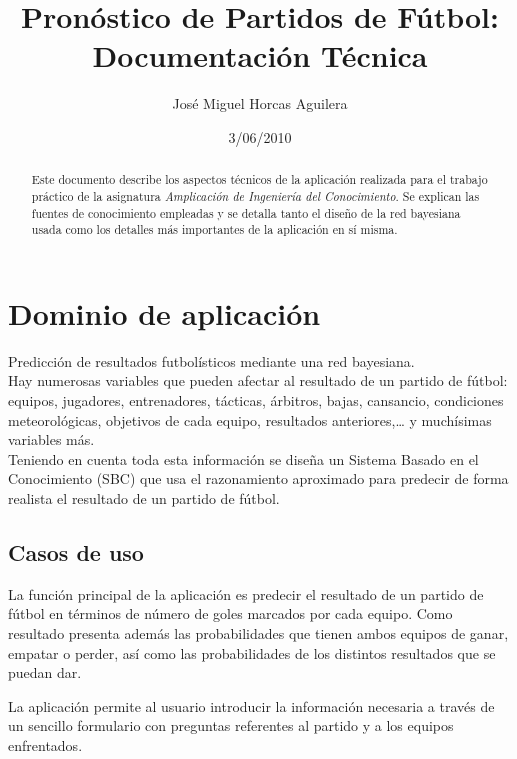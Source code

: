\documentclass[a4paper,12pt]{article}
\title{Pronóstico de Partidos de Fútbol:\\Documentación Técnica}
\author{José Miguel Horcas Aguilera}
\date{3/06/2010}
\begin{document}
\renewcommand{\figurename}{Figura}
\maketitle

\begin{abstract} %
Este documento describe los aspectos técnicos de la aplicación realizada para el trabajo práctico de la asignatura \textit{Amplicación de Ingeniería del Conocimiento}.
Se explican las fuentes de conocimiento empleadas y se detalla tanto el diseño de la red bayesiana usada como los detalles más importantes de la aplicación en sí misma.
\end{abstract}
\tableofcontents
\newpage

\section{Dominio de aplicación}
\label{sec:dominio}
\par
Predicción de resultados futbolísticos mediante una red bayesiana.
\\
Hay numerosas variables que pueden afectar al resultado de un partido de fútbol:
equipos, jugadores, entrenadores, tácticas, árbitros, bajas, cansancio,
condiciones meteorológicas, objetivos de cada equipo, resultados anteriores,\dots
y muchísimas variables más.
\\
Teniendo en cuenta toda esta información se diseña un Sistema Basado en el Conocimiento (SBC) que usa el razonamiento aproximado para predecir de forma realista el resultado de un partido de fútbol.

\subsection{Casos de uso}
\par
La función principal de la aplicación es predecir el resultado de un partido de fútbol en términos de número de goles marcados por cada equipo.
Como resultado presenta además las probabilidades que tienen ambos equipos de ganar, empatar o perder, así como las probabilidades de los distintos resultados que se puedan dar.
\par
La aplicación permite al usuario introducir la información necesaria a través de un sencillo formulario con preguntas referentes al partido y a los equipos enfrentados.
\end{document}
